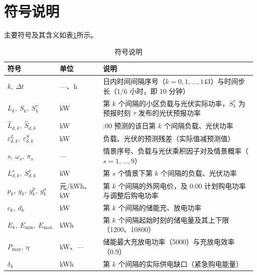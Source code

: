 
\section{符号说明}

主要符号及其含义如表\ref{tab:符号说明}所示。

\begin{table}[H]
  \centering
  \caption{符号说明}
  \label{tab:符号说明}
  {\small
  \renewcommand{\arraystretch}{0.95}
  \begin{tabular}{>{\centering\arraybackslash}p{}>{\centering\arraybackslash}p{}>{\centering\arraybackslash}p{}}
    \toprule
    符号 & 单位 & 说明 \\
    \midrule
    $k,\ \Delta t$ & —、h & 日内时间间隔序号（$k=0,1,\dots,143$）与时间步长（$1/6$ 小时，即 10 分钟） \\
    $L_k,\ S_k,\ S^{\tau}_k$ & kW & 第 $k$ 个间隔的小区负载与光伏实际功率，$S^{\tau}_k$ 为预报时刻 $\tau$ 发布的光伏预报功率 \\
    $\hat L_{d,k},\ \hat S_{d,k}$ & kW & 0:00 预测的该日第 $k$ 个间隔负载、光伏功率 \\
    $\varepsilon^{L}_{d,k},\ \varepsilon^{S}_{d,k}$ & kW & 负载、光伏的预测残差（实际值减预测值） \\
    $s,\ \omega_s,\ \pi_s$ & — & 情景序号、负载与光伏乘积因子对及情景概率（$s=1,\dots,9$） \\
    $L^{s}_{d,k},\ S^{s}_{d,k}$ & kW & 第 $s$ 个情景下第 $k$ 个间隔的负载、光伏功率 \\
    $p_k,\ g_k,\ g^{\mathrm{p}}_k,\ g^{\mathrm{a}}_k$ & 元/kWh、kW & 第 $k$ 个间隔的外网电价，及 0:00 计划购电功率与调整后购电功率 \\
    $c_k,\ d_k$ & kW & 第 $k$ 个间隔的储能充、放电功率 \\
    $E_k,\ E_{\min},\ E_{\max}$ & kWh & 第 $k$ 个间隔起始时刻的储电量及其上下限（1200、10800） \\
    $P_{\max},\ \eta$ & kW、— & 储能最大充放电功率（5000）与充放电效率（0.9） \\
    $\delta_k$ & kWh & 第 $k$ 个间隔的实际供电缺口（紧急购电能量） \\
    \bottomrule
  \end{tabular}}
\end{table}

